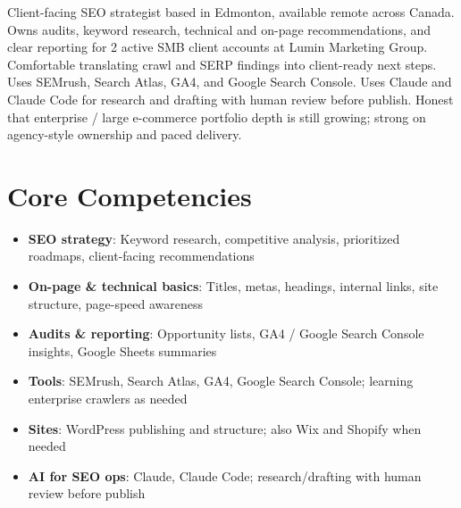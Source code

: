 \documentclass[11pt,a4paper,sans]{moderncv}
\begin{document}
\makecvtitle

\vspace{6pt}
\small{Client-facing SEO strategist based in Edmonton, available remote across Canada. Owns audits, keyword research, technical and on-page recommendations, and clear reporting for 2 active SMB client accounts at Lumin Marketing Group. Comfortable translating crawl and SERP findings into client-ready next steps. Uses SEMrush, Search Atlas, GA4, and Google Search Console. Uses Claude and Claude Code for research and drafting with human review before publish. Honest that enterprise / large e-commerce portfolio depth is still growing; strong on agency-style ownership and paced delivery.}

\section{Core Competencies}
\vspace{1pt}
\begin{itemize}
\item \textbf{SEO strategy}: Keyword research, competitive analysis, prioritized roadmaps, client-facing recommendations
\item \textbf{On-page \& technical basics}: Titles, metas, headings, internal links, site structure, page-speed awareness
\item \textbf{Audits \& reporting}: Opportunity lists, GA4 / Google Search Console insights, Google Sheets summaries
\item \textbf{Tools}: SEMrush, Search Atlas, GA4, Google Search Console; learning enterprise crawlers as needed
\item \textbf{Sites}: WordPress publishing and structure; also Wix and Shopify when needed
\item \textbf{AI for SEO ops}: Claude, Claude Code; research/drafting with human review before publish
\end{itemize}
\end{document}
